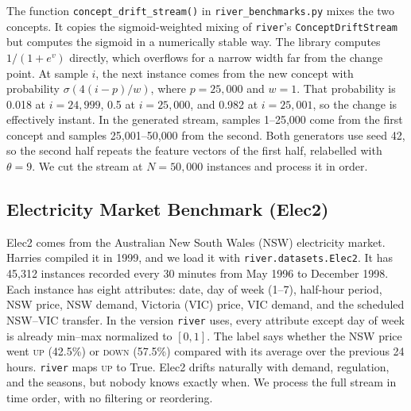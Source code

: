 \documentclass[conference]{IEEEtran}
\begin{document}
The function \texttt{concept\_drift\_stream()} in \texttt{river\_benchmarks.py} mixes the two concepts.
It copies the sigmoid-weighted mixing of \texttt{river}'s \texttt{ConceptDriftStream} but computes the sigmoid in a numerically stable way. The library computes $1/(1+e^{v})$ directly, which overflows for a narrow width far from the change point.
At sample $i$, the next instance comes from the new concept with probability $\sigma(4(i - p)/w)$, where $p = 25{,}000$ and $w = 1$.
That probability is 0.018 at $i = 24{,}999$, 0.5 at $i = 25{,}000$, and 0.982 at $i = 25{,}001$, so the change is effectively instant.
In the generated stream, samples 1--25{,}000 come from the first concept and samples 25{,}001--50{,}000 from the second.
Both generators use seed 42, so the second half repeats the feature vectors of the first half, relabelled with $\theta = 9$.
We cut the stream at $N = 50{,}000$ instances and process it in order.

\subsection{Electricity Market Benchmark (Elec2)}
Elec2 comes from the Australian New South Wales (NSW) electricity market. Harries compiled it in 1999, and we load it with \texttt{river.datasets.Elec2}.
It has 45{,}312 instances recorded every 30 minutes from May 1996 to December 1998.
Each instance has eight attributes: date, day of week (1--7), half-hour period, NSW price, NSW demand, Victoria (VIC) price, VIC demand, and the scheduled NSW--VIC transfer.
In the version \texttt{river} uses, every attribute except day of week is already min--max normalized to $[0, 1]$.
The label says whether the NSW price went \textsc{up} (42.5\%) or \textsc{down} (57.5\%) compared with its average over the previous 24 hours. \texttt{river} maps \textsc{up} to True.
Elec2 drifts naturally with demand, regulation, and the seasons, but nobody knows exactly when.
We process the full stream in time order, with no filtering or reordering.
\end{document}
